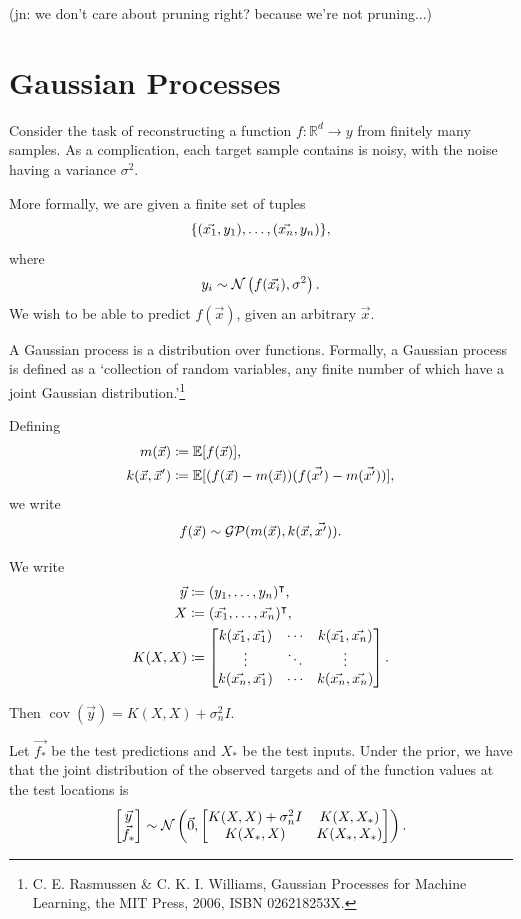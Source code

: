 \documentclass[11pt,twoside,openright]{report}
\newcommand\bbE{\mathbb{E}}
\newcommand\bbR{\mathbb{R}}
\newcommand\cG{\mathcal{G}}
\newcommand\cN{\mathcal{N}}
\newcommand\cP{\mathcal{P}}
\DeclareMathOperator{\cov}{cov}
\newcommand\jn[1]{{\color{red}(jn: #1)}}
\begin{document}
\jn{we don't care about pruning right? because we're not pruning...}

\section{Gaussian Processes}
Consider the task of reconstructing a function $f: \bbR^d \to y$ from finitely many samples. As a complication, each target sample contains is noisy, with the noise having a variance $\sigma^2$.

More formally, we are given a finite set of tuples\[
    \{ (\vec{x_1}, y_1), \dots, (\vec{x_n}, y_n) \}\text,
\] where \[
    y_i \sim \cN\left(f(\vec{x_i}), \sigma^2\right)\text.
\] We wish to be able to predict $f(\vec{x})$, given an arbitrary $\vec{x}$.

A Gaussian process is a distribution over functions. Formally, a Gaussian process is defined as a `collection of random variables, any finite number of which have a joint Gaussian distribution.'\footnote{C. E. Rasmussen \& C. K. I. Williams, Gaussian Processes for Machine Learning, the MIT Press, 2006, ISBN 026218253X.}

Defining \begin{align*}
    m(\vec{x}) &\coloneqq \bbE[f(\vec{x})] \text, \\
    k(\vec{x}, \vec{x}') &\coloneqq \bbE[(f(\vec{x}) - m(\vec{x}))(f(\vec{x'}) - m(\vec{x'}))],
\end{align*} we write \[
    f(\vec{x}) \sim \cG\cP(m(\vec{x}), k(\vec{x}, \vec{x'}))\text.
\]

We write \begin{align*}
    \vec y &\coloneqq (y_1, \dots, y_n)^\intercal \text, \\
    X &\coloneqq (\vec{x_1}, \dots, \vec{x_n})^\intercal \text, \\
    K(X, X) &\coloneqq \begin{bmatrix}
        k(\vec{x_1}, \vec{x_1}) & \cdots & k(\vec{x_1}, \vec{x_n}) \\
        \vdots & \ddots & \vdots \\
        k(\vec{x_n}, \vec{x_1}) & \cdots & k(\vec{x_n}, \vec{x_n})
    \end{bmatrix}\text.
\end{align*}

Then $\cov(\vec{y}) = K(X, X) + \sigma_n^2I$.

Let $\vec{f_*}$ be the test predictions and $X_*$ be the test inputs. Under the prior, we have that the joint distribution of the observed targets and of the function values at the test locations is \[
    \begin{bmatrix}
        \vec{y} \\ \vec{f_*}
    \end{bmatrix} \sim \cN\left(\vec0, \begin{bmatrix}
        K(X, X) + \sigma_n^2I & K(X, X_*) \\
        K(X_*, X) & K(X_*, X_*)
    \end{bmatrix}\right)\text.
\]
\end{document}

